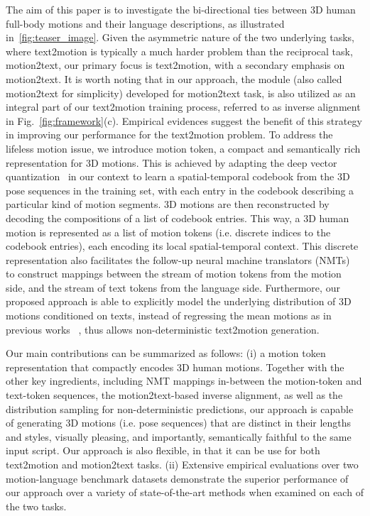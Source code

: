 \documentclass[runningheads]{llncs}
\begin{document}
The aim of this paper is to investigate the bi-directional ties between 3D human full-body motions and their language descriptions, as illustrated in~\cref{fig:teaser_image}. 
Given the asymmetric nature of the two underlying tasks, where text2motion is typically a much harder problem than the reciprocal task, motion2text, our primary focus is text2motion, with a secondary emphasis on motion2text. It is worth noting that in our approach, the module (also called motion2text for simplicity) developed for motion2text task, is also utilized as an integral part of our text2motion training process, referred to as inverse alignment in Fig.~\ref{fig:framework}(c). Empirical evidences suggest the benefit of this strategy in improving our performance for the text2motion problem.
To address the lifeless motion issue, we introduce motion token, a compact and semantically rich representation for 3D motions. This is achieved by adapting the deep vector quantization~\cite{van2017neural} in our context to learn a spatial-temporal codebook from the 3D pose sequences in the training set, with each entry in the codebook describing a particular kind of motion segments. 3D motions are then reconstructed by decoding the compositions of a list of codebook entries. This way, a 3D human motion is represented as a list of motion tokens (i.e. discrete indices to the codebook entries), each encoding its local spatial-temporal context. This discrete representation also facilitates the follow-up neural machine translators (NMTs)~\cite{vaswani2017attention,Bahdanau2014Neural} to construct mappings between the stream of motion tokens from the motion side, and the stream of text tokens from the language side. Furthermore, our proposed approach is able to explicitly model the underlying distribution of 3D motions conditioned on texts, instead of regressing the mean motions as in previous works ~\cite{ahuja2019language2pose,ghosh2021synthesis,lin2018generating,yamada2018paired,plappert2018learning}, thus allows non-deterministic text2motion generation.



Our main contributions can be summarized as follows: (i) a motion token representation that compactly encodes 3D human motions. Together with the other key ingredients, including NMT mappings in-between the motion-token and text-token sequences, the motion2text-based inverse alignment, as well as the distribution sampling for non-deterministic predictions, our approach is capable of generating 3D motions (i.e. pose sequences) that are distinct in their lengths and styles, visually pleasing, and importantly, semantically faithful to the same input script. 
Our approach is also flexible, in that it can be use for both text2motion and motion2text tasks. (ii) Extensive empirical evaluations over two motion-language benchmark datasets demonstrate the superior performance of our approach over a variety of state-of-the-art methods when examined on each of the two tasks. 
\end{document}

